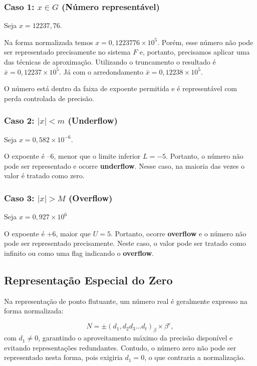 \subsubsection{Caso 1: \( x \in G \) (Número representável)}
Seja $x = 12237,76$. 

Na forma normalizada temos \(x = 0,1223776 \times10^5\).
Porém, esse número não pode ser representado precisamente no sistema $F$ e, portanto, precisamos aplicar uma das técnicas de aproximação. Utilizando o truncamento o resultado é \( \bar{x} = 0{,}12237 \times 10^5 \). Já com o arredondamento \( \bar{x} = 0{,}12238 \times 10^5 \).

O número está dentro da faixa de expoente permitida e é representável com perda controlada de precisão.

\subsubsection*{Caso 2: \( |x| < m \) (Underflow)}

Seja \( x = 0{,}582 \times 10^{-6} \).

O expoente é \(–6\), menor que o limite inferior $L = -5$. Portanto, o número não pode ser representado e ocorre \textbf{underflow}. Nesse caso, na maioria das vezes o valor é tratado como zero.

\subsubsection*{Caso 3: \( |x| > M \) (Overflow)}

Seja \( x = 0{,}927 \times 10^6 \)

O expoente é +6, maior que $U = 5$. 
Portanto, ocorre \textbf{overflow} e o número não pode ser representado precisamente. Neste caso, o valor pode ser tratado como infinito ou como uma flag indicando o \textbf{overflow}.


\subsection{Representação Especial do Zero}

Na representação de ponto flutuante, um número real é geralmente expresso na forma normalizada:

\[
N = \pm (d_1{,}d_2 d_3 \ldots d_t)_\beta \times \beta^{e},
\]
com \( d_1 \neq 0 \), garantindo o aproveitamento máximo da precisão disponível e evitando representações redundantes. Contudo, o número zero não pode ser representado nesta forma, pois exigiria \( d_1 = 0 \), o que contraria a normalização. 


